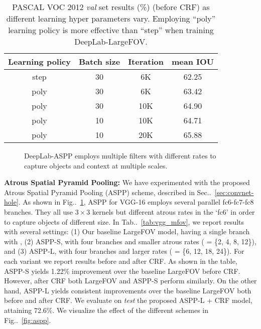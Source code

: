 \documentclass[10pt,journal,compsoc]{IEEEtran}
\makeatletter
\newcommand{\figref}[1]{Fig\onedot~\ref{#1}}
\newcommand{\secref}[1]{Sec\onedot~\ref{#1}}
\newcommand{\tabref}[1]{Tab\onedot~\ref{#1}}
\newcommand{\by}[2]{\ensuremath{#1 \! \times \! #2}}
\def\onedot{\ifx\@let@token.\else.\null\fi\xspace}
\makeatother
\begin{document}
\begin{table}[!t]
  \centering
  \addtolength{\tabcolsep}{2.5pt}
  \begin{tabular}{c c c c}
    \toprule[0.2 em]
    {\bf Learning policy} & {\bf Batch size} & {\bf Iteration} & {\bf mean IOU} \\
    \toprule[0.2em]
    step & 30 & 6K & 62.25 \\
    \midrule
    poly & 30 & 6K & 63.42 \\
    poly & 30 & 10K & 64.90 \\
    poly & 10 & 10K & 64.71 \\
    poly & 10 & 20K & 65.88 \\
    \bottomrule[0.1em]
  \end{tabular}
  \caption{PASCAL VOC 2012 \textit{val} set results (\%) (before CRF) as
    different learning hyper parameters vary. Employing ``poly'' learning
    policy is more effective than ``step'' when training DeepLab-LargeFOV.}
  \label{tab:val_poly}
\end{table}


\begin{figure}[!t]
  \centering
  \caption{DeepLab-ASPP employs multiple filters with different rates to capture objects and context at multiple
    scales.}
  \label{fig:diff_hole}
\end{figure}

\textbf{Atrous Spatial Pyramid Pooling:} We have experimented with the proposed
Atrous Spatial Pyramid Pooling (ASPP) scheme, described in
\secref{sec:convnet-hole}. As shown in \figref{fig:diff_hole}, ASPP for VGG-16
employs several parallel fc6-fc7-fc8 branches. They all use \by{3}{3} kernels
but different atrous rates  in the `fc6' in order to capture objects of
different size. In \tabref{tab:vgg_mfov}, we report results with several
settings:
(1) Our baseline LargeFOV model, having a single branch with ,
(2) ASPP-S, with four branches and smaller atrous rates ( = \{2, 4, 8, 12\}), and
(3) ASPP-L, with four branches and larger rates ( = \{6, 12, 18, 24\}).
For each variant we report results before and after CRF.
As shown in the table, ASPP-S yields 1.22\% improvement over the baseline
LargeFOV before CRF. However, after CRF both LargeFOV and ASPP-S perform similarly.
On the other hand, ASPP-L yields consistent improvements over the baseline LargeFOV
both before and after CRF. We evaluate on \textit{test} the proposed ASPP-L + CRF
model, attaining 72.6\%. We visualize the effect of the different schemes in
\figref{fig:aspp}.
\end{document}
